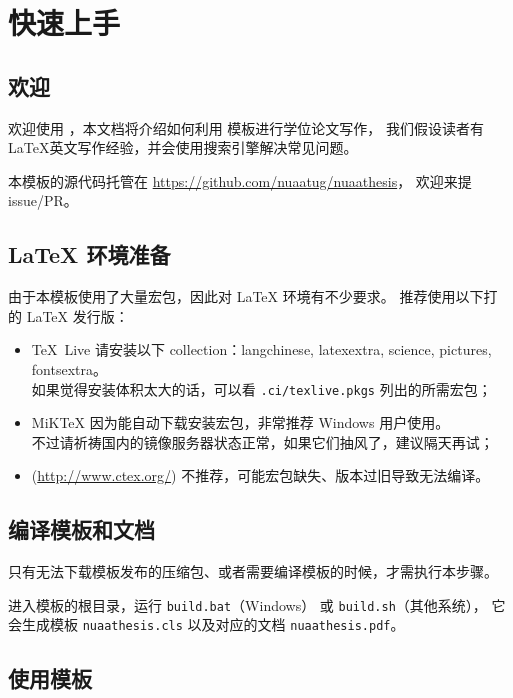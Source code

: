 
\chapter{快速上手}

\section{欢迎}

欢迎使用 \nuaathesis，本文档将介绍如何利用 \nuaathesis 模板进行学位论文写作，
我们假设读者有 \LaTeX 英文写作经验，并会使用搜索引擎解决常见问题。

本模板的源代码托管在 \url{https://github.com/nuaatug/nuaathesis}，
欢迎来提 issue/PR。

\section{\LaTeX{} 环境准备}

由于本模板使用了大量宏包，因此对 \LaTeX{} 环境有不少要求。
推荐使用以下打  的 \LaTeX{} 发行版：
\begin{itemize}
\item[\ding{51}]\TeX~Live 请安装以下 collection：langchinese, latexextra, science, pictures, fontsextra。\\
如果觉得安装体积太大的话，可以看 \texttt{.ci/texlive.pkgs} 列出的所需宏包；
\item[\ding{51}]MiK\TeX{} 因为能自动下载安装宏包，非常推荐 Windows 用户使用。\\
不过请祈祷国内的镜像服务器状态正常，如果它们抽风了，建议隔天再试；
\item[\ding{53}]\CTeX{} (\url{http://www.ctex.org/}) 不推荐，可能宏包缺失、版本过旧导致无法编译。
\end{itemize}

\section{编译模板和文档}

只有无法下载模板发布的压缩包、或者需要编译模板的时候，才需执行本步骤。

进入模板的根目录，运行 \texttt{build.bat}（Windows） 或 \texttt{build.sh}（其他系统），
它会生成模板 \texttt{nuaathesis.cls} 以及对应的文档 \texttt{nuaathesis.pdf}。

\section{使用模板}

